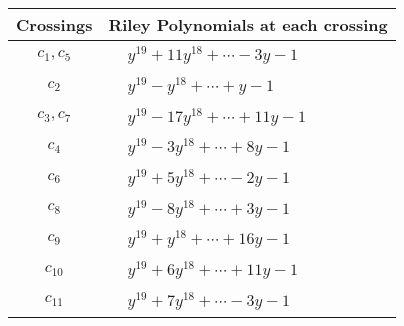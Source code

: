 \documentclass[1p]{elsarticle_modified}
\theoremstyle{definition}
\begin{document}
\begin{tabular}{m{50pt}|m{274pt}}
Crossings & \hspace{64pt}Riley Polynomials at each crossing \\
\hline $$\begin{aligned}c_{1},c_{5}\end{aligned}$$&$\begin{aligned}
&y^{19}+11 y^{18}+\cdots-3 y-1
\end{aligned}$\\
\hline $$\begin{aligned}c_{2}\end{aligned}$$&$\begin{aligned}
&y^{19}- y^{18}+\cdots+y-1
\end{aligned}$\\
\hline $$\begin{aligned}c_{3},c_{7}\end{aligned}$$&$\begin{aligned}
&y^{19}-17 y^{18}+\cdots+11 y-1
\end{aligned}$\\
\hline $$\begin{aligned}c_{4}\end{aligned}$$&$\begin{aligned}
&y^{19}-3 y^{18}+\cdots+8 y-1
\end{aligned}$\\
\hline $$\begin{aligned}c_{6}\end{aligned}$$&$\begin{aligned}
&y^{19}+5 y^{18}+\cdots-2 y-1
\end{aligned}$\\
\hline $$\begin{aligned}c_{8}\end{aligned}$$&$\begin{aligned}
&y^{19}-8 y^{18}+\cdots+3 y-1
\end{aligned}$\\
\hline $$\begin{aligned}c_{9}\end{aligned}$$&$\begin{aligned}
&y^{19}+y^{18}+\cdots+16 y-1
\end{aligned}$\\
\hline $$\begin{aligned}c_{10}\end{aligned}$$&$\begin{aligned}
&y^{19}+6 y^{18}+\cdots+11 y-1
\end{aligned}$\\
\hline $$\begin{aligned}c_{11}\end{aligned}$$&$\begin{aligned}
&y^{19}+7 y^{18}+\cdots-3 y-1
\end{aligned}$\\
\hline
\end{tabular}\\~\\
\end{document}
